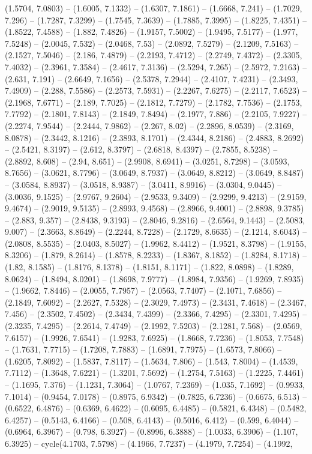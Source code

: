 (1.5704, 7.0803) -- (1.6005, 7.1332) -- (1.6307, 7.1861) -- (1.6668, 7.241) -- (1.7029, 7.296) -- (1.7287, 7.3299) -- (1.7545, 7.3639) -- (1.7885, 7.3995) -- (1.8225, 7.4351) -- (1.8522, 7.4588) -- (1.882, 7.4826) -- (1.9157, 7.5002) -- (1.9495, 7.5177) -- (1.977, 7.5248) -- (2.0045, 7.532) -- (2.0468, 7.53) -- (2.0892, 7.5279) -- (2.1209, 7.5163) -- (2.1527, 7.5046) -- (2.186, 7.4879) -- (2.2193, 7.4712) -- (2.2749, 7.4372) -- (2.3305, 7.4032) -- (2.3961, 7.3584) -- (2.4617, 7.3136) -- (2.5294, 7.265) -- (2.5972, 7.2163) -- (2.631, 7.191) -- (2.6649, 7.1656) -- (2.5378, 7.2944) -- (2.4107, 7.4231) -- (2.3493, 7.4909) -- (2.288, 7.5586) -- (2.2573, 7.5931) -- (2.2267, 7.6275) -- (2.2117, 7.6523) -- (2.1968, 7.6771) -- (2.189, 7.7025) -- (2.1812, 7.7279) -- (2.1782, 7.7536) -- (2.1753, 7.7792) -- (2.1801, 7.8143) -- (2.1849, 7.8494) -- (2.1977, 7.886) -- (2.2105, 7.9227) -- (2.2274, 7.9544) -- (2.2444, 7.9862) -- (2.267, 8.02) -- (2.2896, 8.0539) -- (2.3169, 8.0878) -- (2.3442, 8.1216) -- (2.3893, 8.1701) -- (2.4344, 8.2186) -- (2.4883, 8.2692) -- (2.5421, 8.3197) -- (2.612, 8.3797) -- (2.6818, 8.4397) -- (2.7855, 8.5238) -- (2.8892, 8.608) -- (2.94, 8.651) -- (2.9908, 8.6941) -- (3.0251, 8.7298) -- (3.0593, 8.7656) -- (3.0621, 8.7796) -- (3.0649, 8.7937) -- (3.0649, 8.8212) -- (3.0649, 8.8487) -- (3.0584, 8.8937) -- (3.0518, 8.9387) -- (3.0411, 8.9916) -- (3.0304, 9.0445) -- (3.0036, 9.1525) -- (2.9767, 9.2604) -- (2.9533, 9.3409) -- (2.9299, 9.4213) -- (2.9159, 9.4674) -- (2.9019, 9.5135) -- (2.8993, 9.4568) -- (2.8966, 9.4001) -- (2.8898, 9.3785) -- (2.883, 9.357) -- (2.8438, 9.3193) -- (2.8046, 9.2816) -- (2.6564, 9.1443) -- (2.5083, 9.007) -- (2.3663, 8.8649) -- (2.2244, 8.7228) -- (2.1729, 8.6635) -- (2.1214, 8.6043) -- (2.0808, 8.5535) -- (2.0403, 8.5027) -- (1.9962, 8.4412) -- (1.9521, 8.3798) -- (1.9155, 8.3206) -- (1.879, 8.2614) -- (1.8578, 8.2233) -- (1.8367, 8.1852) -- (1.8284, 8.1718) -- (1.82, 8.1585) -- (1.8176, 8.1378) -- (1.8151, 8.1171) -- (1.822, 8.0898) -- (1.8289, 8.0624) -- (1.8494, 8.0201) -- (1.8698, 7.9777) -- (1.8984, 7.9356) -- (1.9269, 7.8935) -- (1.9662, 7.8446) -- (2.0055, 7.7957) -- (2.0563, 7.7407) -- (2.1071, 7.6856) -- (2.1849, 7.6092) -- (2.2627, 7.5328) -- (2.3029, 7.4973) -- (2.3431, 7.4618) -- (2.3467, 7.456) -- (2.3502, 7.4502) -- (2.3434, 7.4399) -- (2.3366, 7.4295) -- (2.3301, 7.4295) -- (2.3235, 7.4295) -- (2.2614, 7.4749) -- (2.1992, 7.5203) -- (2.1281, 7.568) -- (2.0569, 7.6157) -- (1.9926, 7.6541) -- (1.9283, 7.6925) -- (1.8668, 7.7236) -- (1.8053, 7.7548) -- (1.7631, 7.7715) -- (1.7208, 7.7883) -- (1.6891, 7.7975) -- (1.6573, 7.8066) -- (1.6205, 7.8092) -- (1.5837, 7.8117) -- (1.5634, 7.806) -- (1.543, 7.8004) -- (1.4539, 7.7112) -- (1.3648, 7.6221) -- (1.3201, 7.5692) -- (1.2754, 7.5163) -- (1.2225, 7.4461) -- (1.1695, 7.376) -- (1.1231, 7.3064) -- (1.0767, 7.2369) -- (1.035, 7.1692) -- (0.9933, 7.1014) -- (0.9454, 7.0178) -- (0.8975, 6.9342) -- (0.7825, 6.7236) -- (0.6675, 6.513) -- (0.6522, 6.4876) -- (0.6369, 6.4622) -- (0.6095, 6.4485) -- (0.5821, 6.4348) -- (0.5482, 6.4257) -- (0.5143, 6.4166) -- (0.508, 6.4143) -- (0.5016, 6.412) -- (0.599, 6.4044) -- (0.6964, 6.3967) -- (0.798, 6.3927) -- (0.8996, 6.3888) -- (1.0033, 6.3906) -- (1.107, 6.3925) -- cycle(4.1703, 7.5798) -- (4.1966, 7.7237) -- (4.1979, 7.7254) -- (4.1992, 